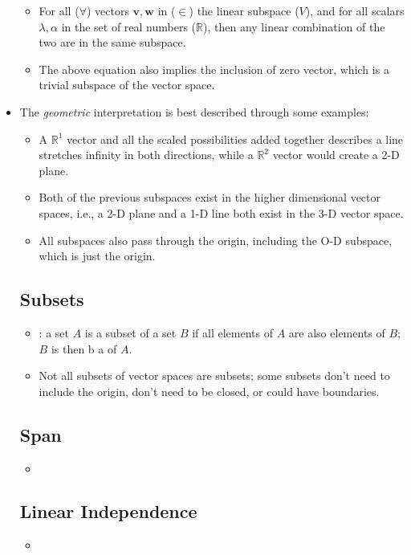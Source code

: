 \begin{itemize}
\begin{itemize}
      \item For all (\(\forall \)) vectors \(\bm{v},\bm{w}\) in (\(\in \)) the linear subspace (\(V\)), and for all scalars \(\lambda,\alpha \) in the set of real numbers (\(\mathbb{R}\)), then any linear combination of the two are in the same subspace.
      \item The above equation also implies the inclusion of zero vector, which is a trivial subspace of the vector space.
    \end{itemize}
  \item The \emph{geometric} interpretation is best described through some examples:
  \begin{itemize}
    \item A \(\mathbb{R}^1\) vector and all the scaled possibilities added together describes a line stretches infinity in both directions, while a \(\mathbb{R}^2\) vector would create a 2-D plane. 
    \item Both of the previous subspaces exist in the higher dimensional vector spaces, i.e., a 2-D plane and a 1-D line both exist in the 3-D vector space.
    \item All subspaces also pass through the origin, including the O-D subspace, which is just the origin.
  \end{itemize}

  \subsection{Subsets}\label{Subsets}
  \begin{itemize}
    \item {}: a set \(A\) is a subset of a set \(B\) if all elements of \(A\) are also elements of \(B\); \(B\) is then b a  of \(A\).
    \item Not all subsets of vector spaces are subsets; some subsets don't need to include the origin, don't need to be closed, or could have boundaries.
  \end{itemize}
  
  \subsection{Span}\label{Span}
  \begin{itemize}
    \item 
  \end{itemize}
  
  \subsection{Linear Independence}\label{Linear Independence}
  \begin{itemize}
    \item 
  \end{itemize}
  

\end{itemize}
